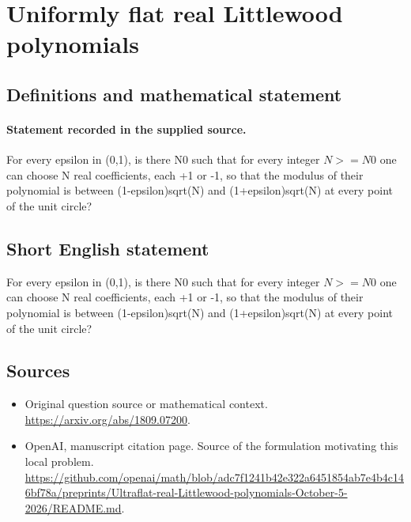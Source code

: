 \documentclass[11pt]{article}
\begin{document}
\section*{Uniformly flat real Littlewood polynomials}\label{30007433}
\subsection{Definitions and mathematical statement}
\paragraph{Statement recorded in the supplied source.}
For every epsilon in (0,1), is there N0 such that for every integer $N>=N0$ one can choose N real coefficients, each +1 or -1, so that the modulus of their polynomial is between (1-epsilon)sqrt(N) and (1+epsilon)sqrt(N) at every point of the unit circle?
\subsection{Short English statement}
For every epsilon in (0,1), is there N0 such that for every integer $N>=N0$ one can choose N real coefficients, each +1 or -1, so that the modulus of their polynomial is between (1-epsilon)sqrt(N) and (1+epsilon)sqrt(N) at every point of the unit circle?
\subsection{Sources}
\begin{itemize}
\item[S1] Original question source or mathematical context.
\url{https://arxiv.org/abs/1809.07200}.
\item[S2] OpenAI, manuscript citation page. Source of the formulation motivating this local problem.
\url{https://github.com/openai/math/blob/adc7f1241b42e322a6451854ab7e4b4c146bf78a/preprints/Ultraflat-real-Littlewood-polynomials-October-5-2026/README.md}.
\end{itemize}
\end{document}

